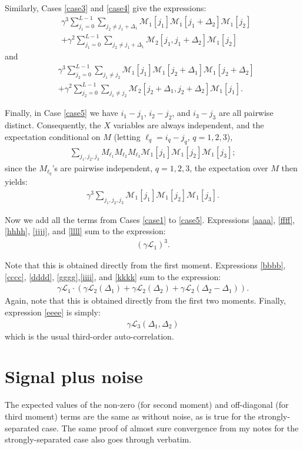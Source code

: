 \documentclass{article}
\theoremstyle{thm}
\theoremstyle{definition}
\newcommand{\1}{\mathbf{1}}
\newcommand{\M}{\mathcal{M}}
\renewcommand{\L}{\mathcal{L}}
\begin{document}
Similarly, Cases \ref{case3} and \ref{case4} give the expressions:
%
\begin{align}
%
& \gamma^3 \sum_{j_1=0}^{L-1} \sum_{j_2 \ne j_1 + \Delta_1} 
        \M_1[j_1] \M_1[j_1 + \Delta_2] \M_1[j_2]
    \label{hhhh} \\
& + \gamma^2 \sum_{j_1=0}^{L-1} \sum_{j_2 \ne j_1 + \Delta_1}  
        \M_2[j_1,j_1+\Delta_2] \M_1[j_2]
    \label{iiii}
%
\end{align}
%
and
%
\begin{align}
%
& \gamma^3 \sum_{j_2=0}^{L-1} \sum_{j_1 \ne j_2} 
        \M_1[j_1] \M_1[j_2 + \Delta_1] \M_1[j_2 + \Delta_2]
    \label{jjjj}\\
& + \gamma^2 \sum_{j_2=0}^{L-1} \sum_{j_1 \ne j_2}  
        \M_2[j_2+\Delta_1,j_2+\Delta_2] \M_1[j_1].
    \label{kkkk}
%
\end{align}

Finally, in Case \ref{case5} we have $i_1 - j_1$, $i_2 - j_2$, and $i_3 - j_3$ are all pairwise distinct. Consequently, the $X$ variables are always independent, and the expectation conditional on $M$ (letting $\ell_q = i_q - j_q$, $q=1,2,3$),
%
\begin{align}
%
\sum_{j_1,j_2,j_3} M_{\ell_1} M_{\ell_2} M_{\ell_3} \M_1[j_1] \M_1[j_2] \M_1[j_3];
%
\end{align}
%
since the $M_{\ell_q}$'s are pairwise independent, $q=1,2,3$, the expectation over $M$ then yields:
%
\begin{align} \label{llll}
%
\gamma^3 \sum_{j_1,j_2,j_3} \M_1[j_1] \M_1[j_2] \M_1[j_3].
%
\end{align}

Now we add all the terms from Cases \ref{case1} to \ref{case5}. Expressions \eqref{aaaa}, \eqref{ffff}, \eqref{hhhh}, \eqref{jjjj}, and \eqref{llll} sum to the expression:
%
\begin{align}
%
(\gamma \L_1)^3.
%
\end{align}

Note that this is obtained directly from the first moment. Expressions \eqref{bbbb}, \eqref{cccc}, \eqref{dddd}, \eqref{gggg},\eqref{iiii}, and \eqref{kkkk} sum to the expression:
%
\begin{align}
%
\gamma \L_1  \cdot 
    ( \gamma\L_2(\Delta_1) + \gamma\L_2(\Delta_2) + \gamma\L_2(\Delta_2-\Delta_1)).
%
\end{align}
%
Again, note that this is obtained directly from the first two moments. Finally, expression \eqref{eeee} is simply:
%
\begin{align}
%
\gamma \L_3(\Delta_1,\Delta_2)
%
\end{align}
%
which is the usual third-order auto-correlation.


%

\section{Signal plus noise}

The expected values of the non-zero (for second moment) and off-diagonal (for third moment) terms are the same as without noise, as is true for the strongly-separated case. The same proof of almost sure convergence from my notes for the strongly-separated case also goes through verbatim.
\end{document}
